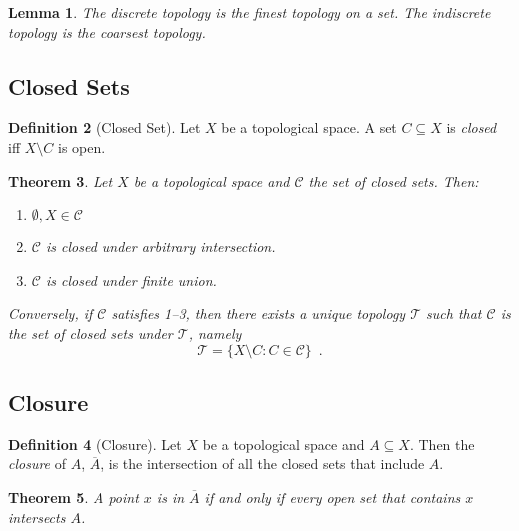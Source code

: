\documentclass{book}
\newtheorem{lm}{Lemma}[chapter]
\newtheorem{thm}[lm]{Theorem}
\theoremstyle{definition}
\newtheorem{df}[lm]{Definition}
\begin{document}
  \begin{lm}
    The discrete topology is the finest topology on a set. The indiscrete 
    topology 
    is the coarsest topology.
  \end{lm}
  
  \subsection{Closed Sets}
  
  \begin{df}[Closed Set]
    Let $X$ be a topological space. A set $C \subseteq X$ is \emph{closed} iff 
    $X 
    \setminus C$ is open.
  \end{df}
  
  \begin{thm}
    Let $X$ be a topological space and $\mathcal{C}$ the set of closed sets. 
    Then:
    \begin{enumerate}
      \item $\emptyset, X \in \mathcal{C}$
      \item $\mathcal{C}$ is closed under arbitrary intersection.
      \item $\mathcal{C}$ is closed under finite union.
    \end{enumerate}
    
    Conversely, if $\mathcal{C}$ satisfies 1--3, then there exists a unique 
    topology $\mathcal{T}$ such that $\mathcal{C}$ is the set of closed sets 
    under 
    $\mathcal{T}$, namely
    \[ \mathcal{T} = \{ X \setminus C : C \in \mathcal{C} \} \enspace . \]
  \end{thm}
  
  \subsection{Closure}
  
  \begin{df}[Closure]
    Let $X$ be a topological space and $A \subseteq X$. Then the \emph{closure} 
    of 
    $A$, $\overline{A}$, is the intersection of all the closed sets that 
    include 
    $A$.
  \end{df}
  
  \begin{thm}
    \label{thm:topology:closure:membership}
    A point $x$ is in $\overline{A}$ if and only if every open set that 
    contains 
    $x$ intersects $A$.
  \end{thm}
  
\end{document}
